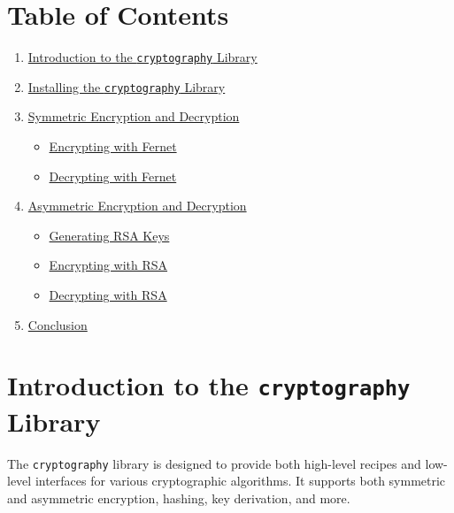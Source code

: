 \documentclass[
  letterpaper,
  DIV=11,
  numbers=noendperiod]{scrreprt}
\providecommand{\tightlist}{%
  \setlength{\itemsep}{0pt}\setlength{\parskip}{0pt}}\usepackage{longtable,booktabs,array}
\begin{document}
\section{Table of Contents}\label{table-of-contents-21}

\begin{enumerate}
\def\labelenumi{\arabic{enumi}.}
\tightlist
\item
  \hyperref[introduction-to-the-cryptography-library]{Introduction to
  the \texttt{cryptography} Library}
\item
  \hyperref[installing-the-cryptography-library]{Installing the
  \texttt{cryptography} Library}
\item
  \hyperref[symmetric-encryption-and-decryption]{Symmetric Encryption
  and Decryption}

  \begin{itemize}
  \tightlist
  \item
    \hyperref[encrypting-with-fernet]{Encrypting with Fernet}
  \item
    \hyperref[decrypting-with-fernet]{Decrypting with Fernet}
  \end{itemize}
\item
  \hyperref[asymmetric-encryption-and-decryption]{Asymmetric Encryption
  and Decryption}

  \begin{itemize}
  \tightlist
  \item
    \hyperref[generating-rsa-keys]{Generating RSA Keys}
  \item
    \hyperref[encrypting-with-rsa]{Encrypting with RSA}
  \item
    \hyperref[decrypting-with-rsa]{Decrypting with RSA}
  \end{itemize}
\item
  \hyperref[conclusion]{Conclusion}
\end{enumerate}

\section{\texorpdfstring{Introduction to the \texttt{cryptography}
Library}{Introduction to the cryptography Library}}\label{introduction-to-the-cryptography-library}

The \texttt{cryptography} library is designed to provide both high-level
recipes and low-level interfaces for various cryptographic algorithms.
It supports both symmetric and asymmetric encryption, hashing, key
derivation, and more.
\end{document}
